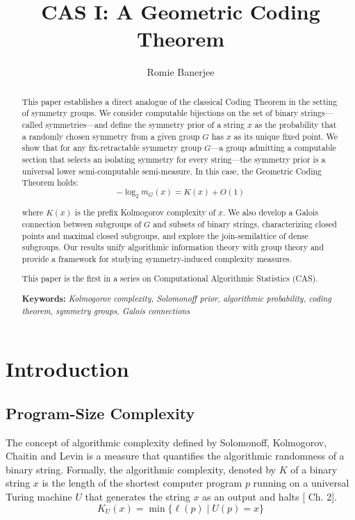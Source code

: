 \documentclass{article}
\title{CAS I: A Geometric Coding Theorem}
\author{Romie Banerjee}
\begin{document}
\maketitle

\begin{abstract}
This paper establishes a direct analogue of the classical Coding Theorem in the setting of symmetry groups. We consider computable bijections on the set of binary strings—called symmetries—and define the symmetry prior of a string $x$ as the probability that a randomly chosen symmetry from a given group $G$ has $x$ as its unique fixed point. We show that for any fix-retractable symmetry group $G$—a group admitting a computable section that selects an isolating symmetry for every string—the symmetry prior is a universal lower semi-computable semi-measure. In this case, the Geometric Coding Theorem holds:
$$
-\log_2 m_G(x) = K(x) + O(1)
$$

where $K(x)$ is the prefix Kolmogorov complexity of $x$. 
We also develop a Galois connection between subgroups of $G$ and subsets of binary strings, characterizing closed points and maximal closed subgroups, and explore the join-semilattice of dense subgroups. Our results unify algorithmic information theory with group theory and provide a framework for studying symmetry-induced complexity measures.

This paper is the first in a series on Computational Algorithmic Statistics (CAS). 

\medskip
\noindent\textbf{Keywords:} \emph{Kolmogorov complexity, Solomonoff prior, algorithmic probability, coding theorem, symmetry groups, Galois connections}
\end{abstract}

\section{Introduction} 
\subsection{Program-Size Complexity}
The concept of algorithmic complexity defined by Solomonoff, Kolmogorov, Chaitin and Levin is a measure that quantifies the algorithmic randomness of a binary string. Formally, the algorithmic complexity, denoted by $K$ of a binary string $x$ is the length of the shortest computer program $p$ running on a universal Turing machine $U$  that generates the string $x$ as an output and halts [\cite{LiVitanyi2008} Ch. 2].
\begin{equation}
    K_U(x) = \min\{\ell(p) \mid U(p) = x\}
\end{equation}
\end{document}
